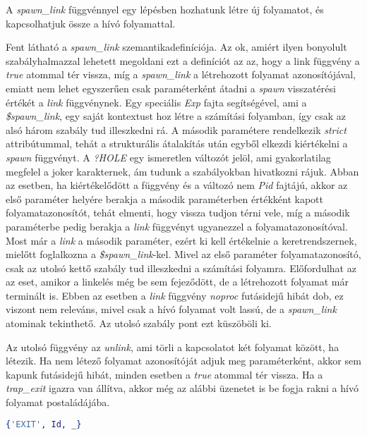 A \textit{spawn\_link} függvénnyel egy lépésben hozhatunk létre új folyamatot, és kapcsolhatjuk össze a hívó folyamattal.



Fent látható a \textit{spawn\_link} szemantikadefiníciója. Az ok, amiért ilyen bonyolult szabályhalmazzal lehetett megoldani ezt a definíciót az az, hogy a link függvény a \textit{true} atommal tér vissza, míg a \textit{spawn\_link} a létrehozott folyamat azonosítójával, emiatt nem lehet egyszerűen csak paraméterként átadni a \textit{spawn} visszatérési értékét a \textit{link} függvénynek. Egy speciális \textit{Exp} fajta segítségével, ami a \textit{\$spawn\_link}, egy saját kontextust hoz létre a számítási folyamban, így csak az alsó három szabály tud illeszkedni rá. A második paramétere rendelkezik \textit{strict} attribútummal, tehát a strukturális átalakítás után egyből elkezdi kiértékelni a \textit{spawn} függvényt. A \textit{?HOLE} egy ismeretlen változót jelöl, ami gyakorlatilag megfelel a joker karakternek, ám tudunk a szabályokban hivatkozni rájuk. Abban az esetben, ha kiértékelődött a függvény és a változó nem \textit{Pid} fajtájú, akkor az első paraméter helyére berakja a második paraméterben értékként kapott folyamatazonosítót, tehát elmenti, hogy vissza tudjon térni vele, míg a második paraméterbe pedig berakja a \textit{link} függvényt ugyanezzel a folyamatazonosítóval. Most már a \textit{link} a második paraméter, ezért ki kell értékelnie a keretrendszernek, mielőtt foglalkozna a \textit{\$spawn\_link}-kel. Mivel az első paraméter folyamatazonosító, csak az utolsó kettő szabály tud illeszkedni a számítási folyamra. Előfordulhat az az eset, amikor a linkelés még be sem fejeződött, de a létrehozott folyamat már terminált is. Ebben az esetben a \textit{link} függvény \textit{noproc} futásidejű hibát dob, ez viszont nem releváns, mivel csak a hívó folyamat volt lassú, de a \textit{spawn\_link} atominak tekinthető. Az utolsó szabály pont ezt küszöböli ki.

Az utolsó függvény az \textit{unlink}, ami törli a kapcsolatot két folyamat között, ha létezik. Ha nem létező folyamat azonosítóját adjuk meg paraméterként, akkor sem kapunk futásidejű hibát, minden esetben a \textit{true} atommal tér vissza. Ha a \textit{trap\_exit} igazra van állítva, akkor még az alábbi üzenetet is be fogja rakni a hívó folyamat postaládájába.

\begin{lstlisting}[language=Erlang]
{'EXIT', Id, _}
\end{lstlisting}

